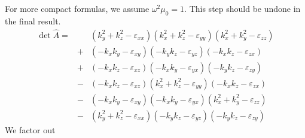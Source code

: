 \documentclass[12pt,a4paper,twoside,openright,BCOR10mm,headsepline,titlepage,abstracton,chapterprefix,final]{scrreprt}
\newcommand\vacuum{0}
\newcommand\wavenumber{k}
\newcommand\vacuumpermeability{\scalarpermeability_{\vacuum}}
\newcommand\scalarpermeability{\mu}
\newcommand\scalarpermittivity{\varepsilon}
\begin{document}
For more compact formulas, we assume $\omega^2 \vacuumpermeability=1$. This step should be undone in the final result.
\begin{eqnarray}
 \det \hat{A} =&& 
     (   \wavenumber_y^2 + \wavenumber_z^2 -  \scalarpermittivity_{xx} )
     (   \wavenumber_x^2 + \wavenumber_z^2 -  \scalarpermittivity_{yy} )
     (   \wavenumber_x^2 + \wavenumber_y^2 -  \scalarpermittivity_{zz} )
 \nonumber\\&+&
     ( - \wavenumber_x \wavenumber_y -  \scalarpermittivity_{xy} )
     ( - \wavenumber_y \wavenumber_z -  \scalarpermittivity_{yz} )
     ( - \wavenumber_x \wavenumber_z -  \scalarpermittivity_{zx} )
 \nonumber\\&+&
     ( - \wavenumber_x \wavenumber_z -  \scalarpermittivity_{xz} )
     ( - \wavenumber_x \wavenumber_y -  \scalarpermittivity_{yx} )
     ( - \wavenumber_y \wavenumber_z -  \scalarpermittivity_{zy} )
 \nonumber\\&-&    
     ( - \wavenumber_x \wavenumber_z -  \scalarpermittivity_{xz} )     
     (   \wavenumber_x^2 + \wavenumber_z^2 -  \scalarpermittivity_{yy} )    
     ( - \wavenumber_x \wavenumber_z -  \scalarpermittivity_{zx} )
 \nonumber\\&-&
     ( - \wavenumber_x \wavenumber_y -  \scalarpermittivity_{xy} )
     ( - \wavenumber_x \wavenumber_y -  \scalarpermittivity_{yx} )
     (   \wavenumber_x^2 + \wavenumber_y^2 -  \scalarpermittivity_{zz} )
 \nonumber\\&-&
     (   \wavenumber_y^2 + \wavenumber_z^2 -  \scalarpermittivity_{xx} )
     ( - \wavenumber_y \wavenumber_z -  \scalarpermittivity_{yz} )
     ( - \wavenumber_y \wavenumber_z -  \scalarpermittivity_{zy} )
\end{eqnarray}
We factor out
\end{document}

